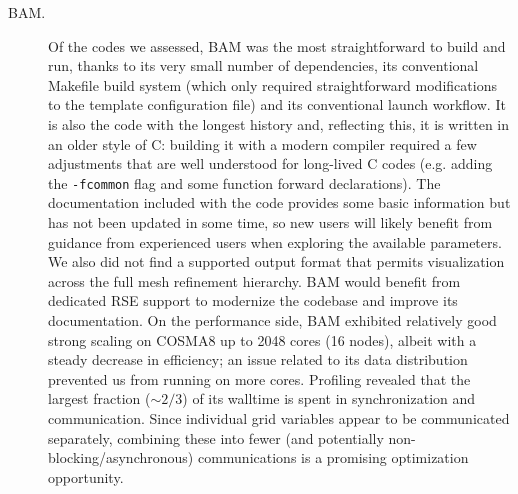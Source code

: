 \documentclass[12pt,a4paper]{article}
\numberwithin{figure}{subsection}
\newcommand{\bam}{\textsc{BAM}\xspace}
\begin{document}
\begin{description}
    \item[\bam.] Of the codes we assessed, \bam was the most straightforward to
    build and run, thanks to its very small number of dependencies, its
    conventional Makefile build system (which only required straightforward
    modifications to the template configuration file) and its conventional
    launch workflow. It is also the code with the longest history and,
    reflecting this, it is written in an older style of C: building it with a
    modern compiler required a few adjustments that are well understood for
    long-lived C codes (e.g. adding the \texttt{-fcommon} flag and some function
    forward declarations). The documentation included with the code provides
    some basic information but has not been updated in some time, so new users
    will likely benefit from guidance from experienced users when exploring the
    available parameters. We also did not find a supported output format that
    permits visualization across the full mesh refinement hierarchy. \bam would 
    benefit from dedicated RSE support to modernize the codebase
    and improve its documentation. On the performance side, \bam exhibited
    relatively good strong scaling on COSMA8 up to 2048 cores (16 nodes), albeit
    with a steady decrease in efficiency; an issue related to its data
    distribution prevented us from running on more cores. Profiling revealed
    that the largest fraction ($\sim 2/3$) of its walltime is spent in
    synchronization and communication. Since individual grid variables appear to
    be communicated separately, combining these into fewer (and potentially
    non-blocking/asynchronous) communications is a promising optimization
    opportunity.


\end{description}
\end{document}

